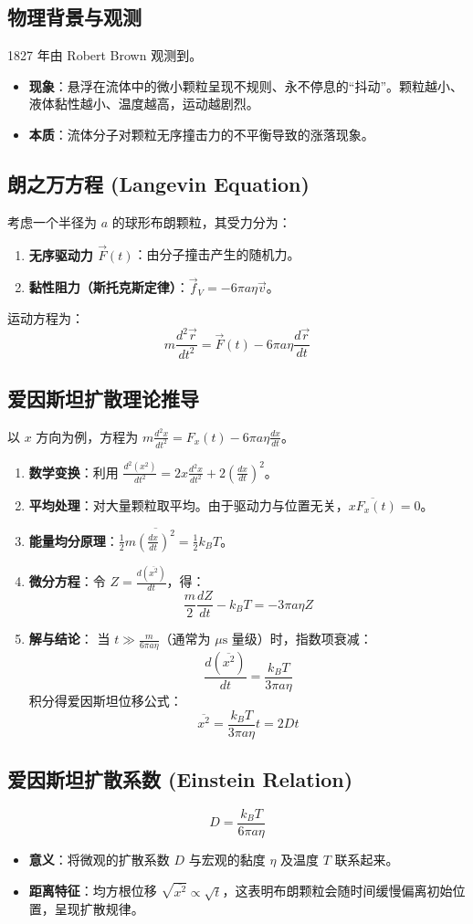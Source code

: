 \documentclass{article}
\begin{document}
\subsection{物理背景与观测}
1827 年由 Robert Brown 观测到。
\begin{itemize}
    \item \textbf{现象}：悬浮在流体中的微小颗粒呈现不规则、永不停息的“抖动”。颗粒越小、液体黏性越小、温度越高，运动越剧烈。
    \item \textbf{本质}：流体分子对颗粒无序撞击力的不平衡导致的涨落现象。
\end{itemize}

\subsection{朗之万方程 (Langevin Equation)}
考虑一个半径为 $a$ 的球形布朗颗粒，其受力分为：
\begin{enumerate}
    \item \textbf{无序驱动力 $\vec{F}(t)$}：由分子撞击产生的随机力。
    \item \textbf{黏性阻力（斯托克斯定律）}：$\vec{f}_V = -6\pi a \eta \vec{v}$。
\end{enumerate}
运动方程为：
\[ m \frac{d^2 \vec{r}}{dt^2} = \vec{F}(t) - 6\pi a \eta \frac{d\vec{r}}{dt} \]

\subsection{爱因斯坦扩散理论推导}
以 $x$ 方向为例，方程为 $m \frac{d^2x}{dt^2} = F_x(t) - 6\pi a \eta \frac{dx}{dt}$。
\begin{enumerate}
    \item \textbf{数学变换}：利用 $\frac{d^2(x^2)}{dt^2} = 2x \frac{d^2x}{dt^2} + 2 \left( \frac{dx}{dt} \right)^2$。
    \item \textbf{平均处理}：对大量颗粒取平均。由于驱动力与位置无关，$\overline{x F_x(t)} = 0$。
    \item \textbf{能量均分原理}：$\frac{1}{2} m \overline{\left( \frac{dx}{dt} \right)^2} = \frac{1}{2} k_B T$。
    \item \textbf{微分方程}：令 $Z = \frac{d(\overline{x^2})}{dt}$，得：
    \[ \frac{m}{2} \frac{dZ}{dt} - k_B T = -3\pi a \eta Z \]
    \item \textbf{解与结论}：
    当 $t \gg \frac{m}{6\pi a \eta}$（通常为 $\mu\text{s}$ 量级）时，指数项衰减：
    \[ \frac{d(\overline{x^2})}{dt} = \frac{k_B T}{3\pi a \eta} \]
    积分得爱因斯坦位移公式：
    \[ \overline{x^2} = \frac{k_B T}{3\pi a \eta} t = 2Dt \]
\end{enumerate}

\subsection{爱因斯坦扩散系数 (Einstein Relation)}
\[ D = \frac{k_B T}{6\pi a \eta} \]
\begin{itemize}
    \item \textbf{意义}：将微观的扩散系数 $D$ 与宏观的黏度 $\eta$ 及温度 $T$ 联系起来。
    \item \textbf{距离特征}：均方根位移 $\sqrt{\overline{x^2}} \propto \sqrt{t}$，这表明布朗颗粒会随时间缓慢偏离初始位置，呈现扩散规律。
\end{itemize}
\end{document}
